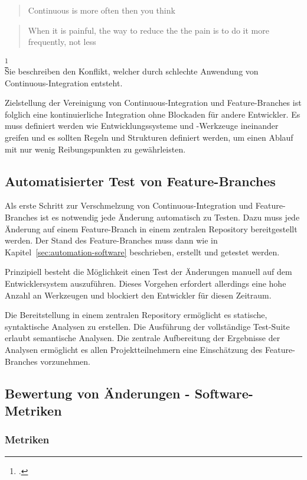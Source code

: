 \blockquote {Continuous is more often then you think} 
 
\blockquote {When it is painful, the way to reduce the the pain is to do it more frequently, not less}\footcite[S.24][]{humble2010} \\

Sie beschreiben den Konflikt, welcher durch schlechte Anwendung von Continuous-Integration entsteht. 

Zielstellung der Vereinigung von Continuous-Integration und Feature-Branches ist folglich eine kontinuierliche Integration ohne Blockaden für andere Entwickler. Es muss definiert werden wie Entwicklungssysteme und -Werkzeuge ineinander greifen und es sollten Regeln und Strukturen definiert werden, um einen Ablauf mit nur wenig Reibungspunkten zu gewährleisten.

\subsection{Automatisierter Test von Feature-Branches}

Als erste Schritt zur Verschmelzung von Continuous-Integration und Feature-Branches ist es notwendig jede Änderung automatisch zu Testen. Dazu muss jede Änderung auf einem Feature-Branch in einem zentralen Repository bereitgestellt werden. Der Stand des Feature-Branches muss dann wie in Kapitel~\ref{sec:automation-software}  beschrieben, erstellt und getestet werden.

Prinzipiell besteht die Möglichkeit einen Test der Änderungen manuell auf dem Entwicklersystem auszuführen. Dieses Vorgehen erfordert allerdings eine hohe Anzahl an Werkzeugen und blockiert den Entwickler für diesen Zeitraum.

Die Bereitstellung in einem zentralen Repository ermöglicht es statische, syntaktische Analysen zu erstellen. Die Ausführung der vollständige Test-Suite erlaubt semantische Analysen. Die zentrale Aufbereitung der Ergebnisse der Analysen ermöglicht es allen Projektteilnehmern eine Einschätzung des Feature-Branches vorzunehmen.

\subsection{Bewertung von Änderungen - Software-Metriken}
\label{subsec:auto-values-metrics}



\subsubsection{Metriken}
